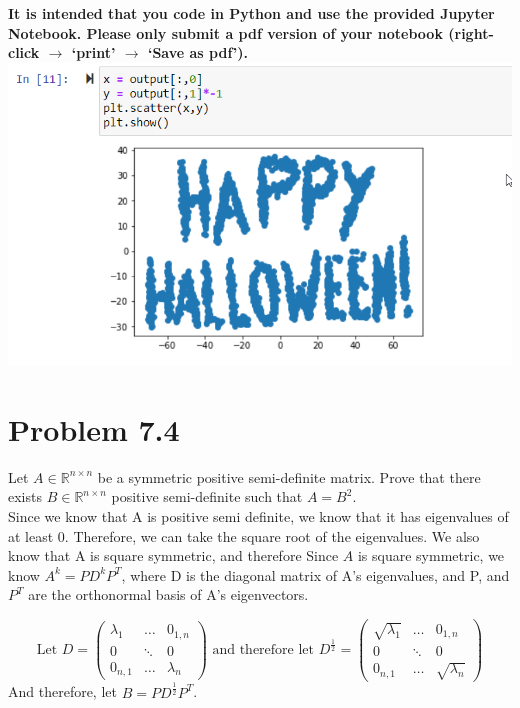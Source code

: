 \documentclass[12pt,twoside]{article}
\begin{document}
	\textbf{It is intended that you code in Python and use the provided Jupyter Notebook. Please only submit a pdf version of your notebook (right-click $\to$ `print' $\to$ `Save as pdf').}
\includegraphics[scale=.7]{happy.png}



\vspace{5mm}

\section{Problem 7.4}
	Let $A \in \mathbb{R}^{n \times n}$ be a symmetric positive semi-definite matrix. Prove that there exists $B \in \mathbb{R}^{n \times n}$ positive  semi-definite such that $A = B^2$.\\

Since we know that A is positive semi definite, we know that it has eigenvalues of at least 0. Therefore, we can take the square root of the eigenvalues. We also know that A is square symmetric, and therefore Since $A$ is square symmetric, we know $A^k=PD^kP^T$, where D is the diagonal matrix of A's eigenvalues, and P, and $P^T$ are the orthonormal basis of A's eigenvectors.

$$
\text{Let } D = \begin{pmatrix}
\lambda_1 & \dots &  0_{1,n}\\
0 & \ddots & 0 \\
0_{n,1} & \dots & \lambda_n
\end{pmatrix} \text{ and therefore let }D^{\frac{1}{2}} = \begin{pmatrix}
\sqrt{\lambda_1} & \dots &  0_{1,n}\\
0 & \ddots & 0 \\
0_{n,1} & \dots & \sqrt{\lambda_n}
\end{pmatrix}
$$ 
And therefore, let $B=PD^{\frac{1}{2}}P^T$. 
\end{document}
